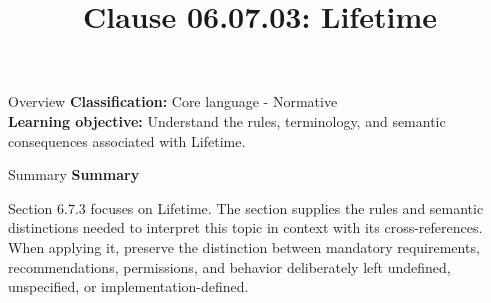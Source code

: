 \documentclass[10pt,letterpaper]{article}
\title{Clause 06.07.03: Lifetime}
\author{}
\date{}
\begin{document}
\maketitle
\begin{CornellOverviewBox}{Overview}
\textbf{Classification:} Core language - Normative\\[2pt]
\textbf{Learning objective:} Understand the rules, terminology, and semantic consequences associated with Lifetime.
\end{CornellOverviewBox}\begin{CornellSummaryBox}{Summary}
{\sffamily\bfseries\color{Accent} Summary}\par\vspace{3pt}Section 6.7.3 focuses on Lifetime. The section supplies the rules and semantic distinctions needed to interpret this topic in context with its cross-references. When applying it, preserve the distinction between mandatory requirements, recommendations, permissions, and behavior deliberately left undefined, unspecified, or implementation-defined.
\end{CornellSummaryBox}
\end{document}
